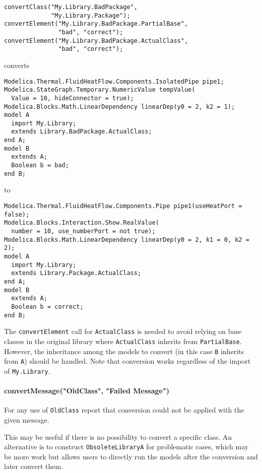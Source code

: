 \begin{example}
\begin{lstlisting}[language=modelica]
convertClass("My.Library.BadPackage",
             "My.Library.Package");
convertElement("My.Library.BadPackage.PartialBase",
               "bad", "correct");
convertElement("My.Library.BadPackage.ActualClass",
               "bad", "correct");
\end{lstlisting}
converts
\begin{lstlisting}[language=modelica]
Modelica.Thermal.FluidHeatFlow.Components.IsolatedPipe pipe1;
Modelica.StateGraph.Temporary.NumericValue tempValue(
  Value = 10, hideConnector = true);
Modelica.Blocks.Math.LinearDependency linearDep(y0 = 2, k2 = 1);
model A
  import My.Library;
  extends Library.BadPackage.ActualClass;
end A;
model B
  extends A;
  Boolean b = bad;
end B;
\end{lstlisting}
to
\begin{lstlisting}[language=modelica]
Modelica.Thermal.FluidHeatFlow.Components.Pipe pipe1(useHeatPort = false);
Modelica.Blocks.Interaction.Show.RealValue(
  number = 10, use_numberPort = not true);
Modelica.Blocks.Math.LinearDependency linearDep(y0 = 2, k1 = 0, k2 = 2);
model A
  import My.Library;
  extends Library.Package.ActualClass;
end A;
model B
  extends A;
  Boolean b = correct;
end B;
\end{lstlisting}
The \lstinline!convertElement! call for \lstinline!ActualClass! is needed to avoid relying on base classes in the original library where \lstinline!ActualClass! inherits from \lstinline!PartialBase!.
However, the inheritance among the models to convert (in this case \lstinline!B! inherits from \lstinline!A!) should be handled.
Note that conversion works regardless of the import of \lstinline!My.Library!.
\end{example}

\paragraph*{convertMessage("OldClass", "Failed Message")}\label{convertmessageoldclass-failed-message}

For any use of \lstinline!OldClass! report that conversion could not be applied with the given message.

\begin{nonnormative}
This may be useful if there is no possibility to convert a specific class.
An alternative is to construct \lstinline!ObsoleteLibraryA! for problematic cases, which may be more work but allows users to directly run the models after the conversion and later convert them.
\end{nonnormative}

